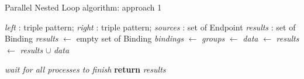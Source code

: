 \begin{algorithm}[h]
    \caption{Parallel Nested Loop algorithm: approach 1}\label{algo:pbj}
    \begin{algorithmic}[1]
        \Require \textit{left} : triple pattern; \textit{right} : triple pattern; \textit{sources} : set of Endpoint
        \Ensure \textit{results} : set of Binding
            \State \textit{results} $\gets$ empty set of Binding
            \State \textit{bindings} $\gets$ 
            \State \textit{groups} $\gets$ 
                \State \textit{data} $\gets$ 
                \State \textit{results} $\gets$ \textit{results} $\cup$ \textit{data}
            \EndFor
            
            \State \emph{wait for all processes to finish}
            \State \textbf{return} \textit{results}
        \EndFunction
    \end{algorithmic}
\end{algorithm}
